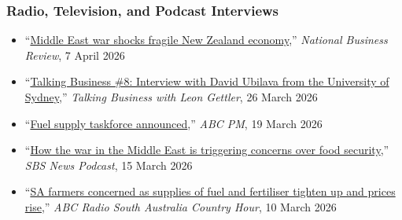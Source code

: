 \documentclass[10pt]{article}
\begin{document}
	\subsubsection*{Radio, Television, and Podcast Interviews} 
	\begin{itemize} 
		\item ``\href{https://www.nbr.co.nz/dollars-and-sense/middle-east-war-shocks-the-fragile-new-zealand-economy/}{Middle East war shocks fragile New Zealand economy},'' \textit{National Business Review}, 7 April 2026
		\item ``\href{https://shows.acast.com/talkingbusiness/episodes/talking-business-8-interview-with-david-ubilava-from-the-uni}{Talking Business \#8: Interview with David Ubilava from the University of Sydney},'' \textit{Talking Business with Leon Gettler}, 26 March 2026
		\item ``\href{https://www.abc.net.au/listen/programs/pm/fuel-supply-taskforce-announced-/106475292}{Fuel supply taskforce announced},'' \textit{ABC PM}, 19 March 2026 
		\item ``\href{https://www.sbs.com.au/news/podcast-episode/how-the-war-in-the-middle-east-is-triggering-concerns-over-food-security/5qwqg147s}{How the war in the Middle East is triggering concerns over food security},'' \textit{SBS News Podcast}, 15 March 2026 
		\item ``\href{https://www.abc.net.au/listen/programs/sa-country-hour/sa-country-hour/106427360}{SA farmers concerned as supplies of fuel and fertiliser tighten up and prices rise},'' \textit{ABC Radio South Australia Country Hour}, 10 March 2026
	\end{itemize}
	
\end{document}
